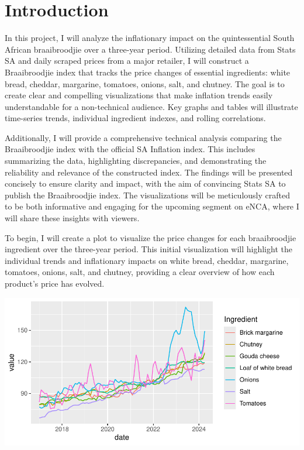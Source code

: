 \documentclass[11pt,preprint, authoryear]{elsarticle}
\let\origfigure\figure
\let\endorigfigure\endfigure
\renewenvironment{figure}[1][2] {
    \expandafter\origfigure\expandafter[H]
} {
    \endorigfigure
}
\numberwithin{equation}{section}
\numberwithin{figure}{section}
\numberwithin{table}{section}
\begin{document}
\headsep 35pt %




\hypertarget{introduction}{%
\section{\texorpdfstring{Introduction
\label{Introduction}}{Introduction }}\label{introduction}}

In this project, I will analyze the inflationary impact on the
quintessential South African braaibroodjie over a three-year period.
Utilizing detailed data from Stats SA and daily scraped prices from a
major retailer, I will construct a Braaibroodjie index that tracks the
price changes of essential ingredients: white bread, cheddar, margarine,
tomatoes, onions, salt, and chutney. The goal is to create clear and
compelling visualizations that make inflation trends easily
understandable for a non-technical audience. Key graphs and tables will
illustrate time-series trends, individual ingredient indexes, and
rolling correlations.

Additionally, I will provide a comprehensive technical analysis
comparing the Braaibroodjie index with the official SA Inflation index.
This includes summarizing the data, highlighting discrepancies, and
demonstrating the reliability and relevance of the constructed index.
The findings will be presented concisely to ensure clarity and impact,
with the aim of convincing Stats SA to publish the Braaibroodjie index.
The visualizations will be meticulously crafted to be both informative
and engaging for the upcoming segment on eNCA, where I will share these
insights with viewers.

To begin, I will create a plot to visualize the price changes for each
braaibroodjie ingredient over the three-year period. This initial
visualization will highlight the individual trends and inflationary
impacts on white bread, cheddar, margarine, tomatoes, onions, salt, and
chutney, providing a clear overview of how each product's price has
evolved.

\begin{figure}[H]

{\centering \includegraphics{Question5_files/figure-latex/Figure 1-1} 

}

\caption{Price changes of braaibroodje ingredients over time \label{Figure1}}\label{fig:Figure 1}
\end{figure}
\end{document}

